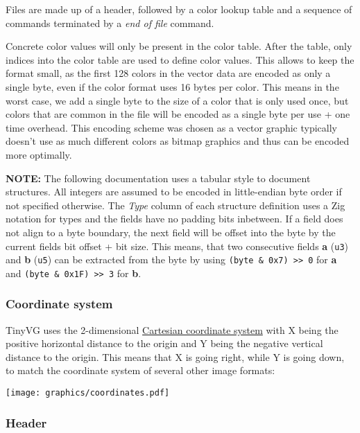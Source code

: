 \documentclass[]{article}
\begin{document}
Files are made up of a header, followed by a color lookup table and a
sequence of commands terminated by a \emph{end of file} command.

Concrete color values will only be present in the color table. After the
table, only indices into the color table are used to define color
values. This allows to keep the format small, as the first 128 colors in
the vector data are encoded as only a single byte, even if the color
format uses 16 bytes per color. This means in the worst case, we add a
single byte to the size of a color that is only used once, but colors
that are common in the file will be encoded as a single byte per use +
one time overhead. This encoding scheme was chosen as a vector graphic
typically doesn't use as much different colors as bitmap graphics and
thus can be encoded more optimally.

\textbf{NOTE:} The following documentation uses a tabular style to
document structures. All integers are assumed to be encoded in
little-endian byte order if not specified otherwise. The \emph{Type}
column of each structure definition uses a Zig notation for types and
the fields have no padding bits inbetween. If a field does not align to
a byte boundary, the next field will be offset into the byte by the
current fields bit offset + bit size. This means, that two consecutive
fields \textbf{a} (\texttt{u3}) and \textbf{b} (\texttt{u5}) can be
extracted from the byte by using
\texttt{(byte\ \&\ 0x7)\ \textgreater{}\textgreater{}\ 0} for \textbf{a}
and \texttt{(byte\ \&\ 0x1F)\ \textgreater{}\textgreater{}\ 3} for
\textbf{b}.

\hypertarget{coordinate-system}{%
\subsubsection{Coordinate system}\label{coordinate-system}}

TinyVG uses the 2-dimensional
\href{https://en.wikipedia.org/wiki/Cartesian_coordinate_system}{Cartesian
coordinate system} with X being the positive horizontal distance to the
origin and Y being the negative vertical distance to the origin. This
means that X is going right, while Y is going down, to match the
coordinate system of several other image formats:

\texttt{[image: graphics/coordinates.pdf]}

\hypertarget{header}{%
\subsubsection{Header}\label{header}}
\end{document}
